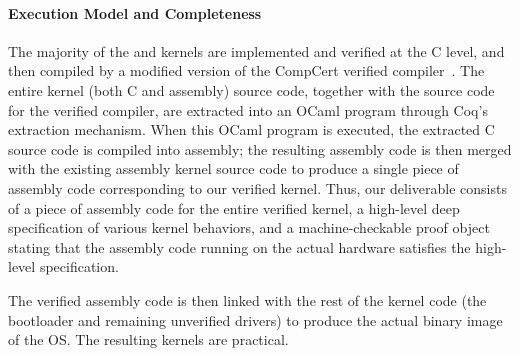 

\paragraph{Execution Model and Completeness}
The majority of the {\mCTOS} and \cCTOS{} kernels are implemented and verified 
at the C level, and then compiled by a modified version of the CompCert verified
compiler~\cite{dscal15}.  The entire kernel (both C and assembly)
source code, together with the source code for the verified compiler,
are extracted into an OCaml program through Coq's extraction
mechanism. When this OCaml program is executed, the extracted C source code 
is compiled into assembly; the resulting assembly code is then merged 
with the existing assembly kernel source code to produce a single piece 
of assembly code corresponding to our verified kernel.  Thus, our deliverable 
consists of a piece of assembly code for the entire verified kernel, a 
high-level deep specification of various kernel behaviors, and a 
machine-checkable proof object stating that the assembly code running on 
the actual hardware satisfies the high-level specification.

The verified assembly code is then linked with the rest of the kernel code
(the bootloader and remaining unverified drivers) to produce the
actual binary image of the OS. The resulting kernels are practical.

